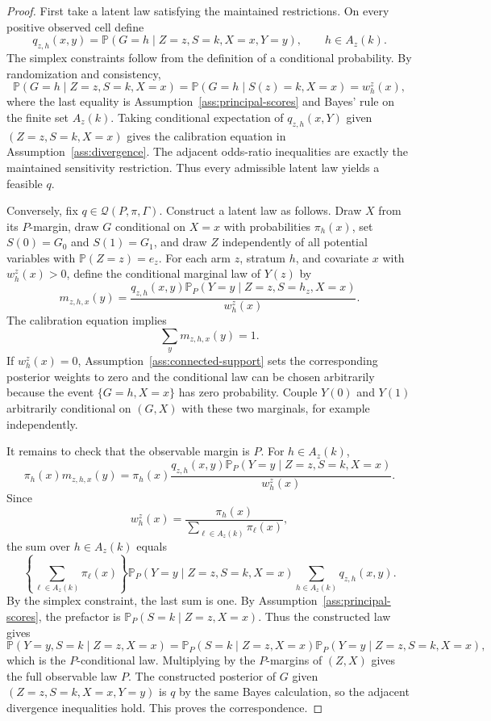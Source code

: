 \documentclass[11pt]{article}
\renewcommand{\Pr}{\mathbb{P}}
\theoremstyle{definition}
\theoremstyle{plain}
\theoremstyle{remark}
\begin{document}
\begin{proof}
First take a latent law satisfying the maintained restrictions.  On every
positive observed cell define
\[
  q_{z,h}(x,y)
  =
  \Pr(G=h\mid Z=z,S=k,X=x,Y=y),
  \qquad h\in A_z(k).
\]
The simplex constraints follow from the definition of a conditional
probability.  By randomization and consistency,
\[
  \Pr(G=h\mid Z=z,S=k,X=x)
  =
  \Pr(G=h\mid S(z)=k,X=x)
  =
  w^z_h(x),
\]
where the last equality is Assumption~\ref{ass:principal-scores} and Bayes'
rule on the finite set \(A_z(k)\).  Taking conditional expectation of
\(q_{z,h}(x,Y)\) given \((Z=z,S=k,X=x)\) gives the calibration equation in
Assumption~\ref{ass:divergence}.  The adjacent odds-ratio inequalities are
exactly the maintained sensitivity restriction.  Thus every admissible latent
law yields a feasible \(q\).

Conversely, fix \(q\in\mathcal Q(P,\pi,\Gamma)\).  Construct a latent law as
follows.  Draw \(X\) from its \(P\)-margin, draw \(G\) conditional on \(X=x\)
with probabilities \(\pi_h(x)\), set \(S(0)=G_0\) and \(S(1)=G_1\), and draw
\(Z\) independently of all potential variables with \(\Pr(Z=z)=e_z\).  For
each arm \(z\), stratum \(h\), and covariate \(x\) with \(w^z_h(x)>0\), define
the conditional marginal law of \(Y(z)\) by
\[
  m_{z,h,x}(y)
  =
  \frac{
    q_{z,h}(x,y)\Pr_P(Y=y\mid Z=z,S=h_z,X=x)
  }{w^z_h(x)}.
\]
The calibration equation implies
\[
  \sum_y m_{z,h,x}(y)=1.
\]
If \(w^z_h(x)=0\), Assumption~\ref{ass:connected-support} sets the corresponding
posterior weights to zero and the conditional law can be chosen arbitrarily
because the event \(\{G=h,X=x\}\) has zero probability.  Couple \(Y(0)\) and
\(Y(1)\) arbitrarily conditional on \((G,X)\) with these two marginals, for
example independently.

It remains to check that the observable margin is \(P\).  For \(h\in A_z(k)\),
\[
  \pi_h(x)m_{z,h,x}(y)
  =
  \pi_h(x)
  \frac{q_{z,h}(x,y)\Pr_P(Y=y\mid Z=z,S=k,X=x)}{w^z_h(x)}.
\]
Since
\[
  w^z_h(x)=\frac{\pi_h(x)}{\sum_{\ell\in A_z(k)}\pi_\ell(x)},
\]
the sum over \(h\in A_z(k)\) equals
\[
  \left\{\sum_{\ell\in A_z(k)}\pi_\ell(x)\right\}
  \Pr_P(Y=y\mid Z=z,S=k,X=x)
  \sum_{h\in A_z(k)}q_{z,h}(x,y).
\]
By the simplex constraint, the last sum is one.  By
Assumption~\ref{ass:principal-scores}, the prefactor is
\(\Pr_P(S=k\mid Z=z,X=x)\).  Thus the constructed law gives
\[
  \Pr(Y=y,S=k\mid Z=z,X=x)
  =
  \Pr_P(S=k\mid Z=z,X=x)
  \Pr_P(Y=y\mid Z=z,S=k,X=x),
\]
which is the \(P\)-conditional law.  Multiplying by the \(P\)-margins of
\((Z,X)\) gives the full observable law \(P\).  The constructed posterior of
\(G\) given \((Z=z,S=k,X=x,Y=y)\) is \(q\) by the same Bayes calculation, so the
adjacent divergence inequalities hold.  This proves the correspondence.
\end{proof}
\end{document}
